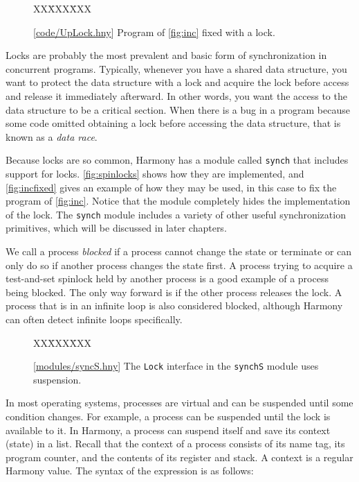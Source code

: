 \documentclass{report}
\newcommand{\harmonysource}[1]{
\begin{tabbing}
XX\=XXX\=XXX\kill
    
\end{tabbing}
}
\newcommand{\harmonylink}[1]{%
[\href{https://www.cs.cornell.edu/home/rvr/harmony/#1}{\underline{#1}}]%
}
\newenvironment{code}{
\tcolorbox
}{
\endtcolorbox
}
\begin{document}
\begin{figure}
\begin{code}
\harmonysource{UpLock}
\end{code}
\caption{\harmonylink{code/UpLock.hny} Program of \autoref{fig:inc} fixed with a lock.}
\label{fig:incfixed}
\end{figure}

Locks are probably the most prevalent and basic form of synchronization
in concurrent programs.  Typically, whenever you have a shared data
structure, you want to protect the data structure with a lock and
acquire the lock before access and release it immediately afterward.
In other words, you want the access to the data structure to be a
critical section.
When there is a bug in a program because some code omitted obtaining
a lock before accessing the data structure, that is known as a
\emph{data race}.

Because locks are so common, Harmony has a module called
\texttt{synch} that includes support for locks.
\autoref{fig:spinlocks} shows how they are implemented, and
\autoref{fig:incfixed} gives an example of how they may be used,
in this case to fix the program of \autoref{fig:inc}.
Notice that the module completely hides the implementation of the
lock.
The \texttt{synch} module includes a variety of other useful
synchronization primitives, which will be discussed in later
chapters.

%

We call a process \emph{blocked}
%
if a process cannot change the state or terminate or can only do so if
another process changes the state first.
A process trying to
acquire a test-and-set spinlock held by another process is a good example
of a process being blocked.
The only way forward is if the other process releases the lock.
A process that is in an infinite loop is also considered blocked,
although Harmony can often detect infinite loops specifically.

\begin{figure}
\begin{code}
\harmonysource{locksusp}
\end{code}
\caption{\harmonylink{modules/syncS.hny} The \texttt{Lock} interface in the \texttt{synchS} module uses suspension.}
\label{fig:suspension}
\end{figure}

In most operating systems, processes are virtual and can be suspended
until some condition changes.  For example, a process can be suspended
until the lock is available to it.
In Harmony, a process can suspend itself and save its context (state) in a
list.  Recall that the context of a process consists of its name tag,
its program counter, and the contents of its register and stack.
A context is a regular Harmony value.
The syntax of the expression is as follows:
\end{document}
